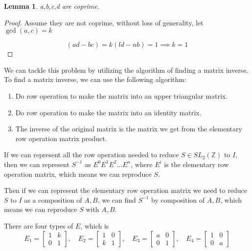 \documentclass[11pt]{article}
\newcommand{\Z}{\mathbb{Z}}
\newtheorem{lemma}{Lemma}
\begin{document}


\begin{center}
\end{center}



\begin{lemma}\label{lem1}
	a,b,c,d are coprime.
\end{lemma}

\begin{proof}
	Assume they are not coprime,
	without loss of generality, let $\operatorname{gcd}(a,c)=k$

	\[
		(ad-bc)=k(ld-nb) =1 \implies k=1
	\]
\end{proof}

We can tackle this problem by utilizing the algorithm of finding a matrix inverse.
To find a matrix inverse, we can use the following algorithm:

\begin{enumerate}
	\item Do row operation to make the matrix into an upper triangular matrix.
	\item Do row operation to make the matrix into an identity matrix.
	\item The inverse of the original matrix is the matrix we get from the elementary row operation matrix product.
\end{enumerate}


If we can represent all the row operation needed to reduce $S \in SL_2(\Z)$ to $I$,
then we can represent $S^{-1}$ as $E^{0}E^{1}E^{2}...E^{n}$,
where $E^{i}$ is the elementary row operation matrix,
which means we can reproduce $S$.

Then if we can represent the elementary row operation matrix we need to reduce \(S\) to \(I\)
as a composition of \(A,B\), we can find \(S^{-1}\) by composition of \(A,B\), which means we can reproduce \(S\) with \(A,B\).

There are four types of \(E\), which is 
\[
	E_1 = \begin{bmatrix}
		1 & k \\
		0 & 1
	\end{bmatrix}, \quad
	E_2 = \begin{bmatrix}
		1 & 0 \\
		k & 1
	\end{bmatrix}, \quad
	E_3 = \begin{bmatrix}
		a & 0 \\
		0 & 1
	\end{bmatrix}, \quad
	E_4 = \begin{bmatrix}
		1 & 0 \\
		0 & a
	\end{bmatrix}
\]
\end{document}
